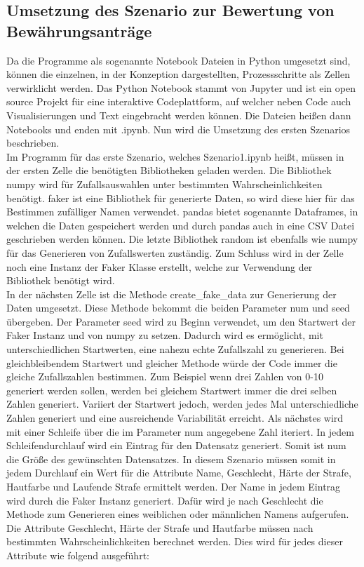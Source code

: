 \begin{onehalfspace}
\subsection{Umsetzung des Szenario zur Bewertung von Bewährungsanträge}
\label{umsetzungsz1}
Da die Programme als sogenannte Notebook Dateien in Python umgesetzt sind, können die einzelnen, in der Konzeption dargestellten, Prozessschritte als Zellen verwirklicht werden. Das Python Notebook stammt von Jupyter und ist ein open source Projekt für eine interaktive Codeplattform, auf welcher neben Code auch Visualisierungen und Text eingebracht werden können. Die Dateien heißen dann Notebooks und enden mit \glqq{}.ipynb\grqq{}. Nun wird die Umsetzung des ersten Szenarios beschrieben.\\
Im Programm für das erste Szenario, welches \glqq{}Szenario1.ipynb\grqq{} heißt, müssen in der ersten Zelle die benötigten Bibliotheken geladen werden.
Die Bibliothek \glqq{}numpy\grqq{} wird für Zufallsauswahlen unter bestimmten Wahrscheinlichkeiten benötigt. \glqq{}faker\grqq{} ist eine Bibliothek für generierte Daten, so wird diese hier für das Bestimmen zufälliger Namen verwendet. \glqq{}pandas\grqq{} bietet sogenannte Dataframes, in welchen die Daten gespeichert werden und durch \glqq{}pandas\grqq{} auch in eine CSV Datei geschrieben werden können. Die letzte Bibliothek \glqq{}random\grqq{} ist ebenfalls wie \glqq{}numpy\grqq{} für das Generieren von Zufallswerten zuständig. Zum Schluss wird in der Zelle noch eine Instanz der Faker Klasse erstellt, welche zur Verwendung der Bibliothek benötigt wird.\\
In der nächsten Zelle ist die Methode \glqq{}create\_fake\_data\grqq{} zur Generierung der Daten umgesetzt. Diese Methode bekommt die beiden Parameter \glqq{}num\grqq{} und \glqq{}seed\grqq{} übergeben. Der Parameter \glqq{}seed\grqq{} wird zu Beginn verwendet, um den Startwert der Faker Instanz und von \glqq{}numpy\grqq{} zu setzen. Dadurch wird es ermöglicht, mit unterschiedlichen Startwerten, eine nahezu \glqq{}echte\grqq{} Zufallszahl zu generieren. Bei gleichbleibendem Startwert und gleicher Methode würde der Code immer die gleiche Zufallszahlen bestimmen. Zum Beispiel wenn drei Zahlen von 0-10 generiert werden sollen, werden bei gleichem Startwert immer die drei selben Zahlen generiert. Variiert der Startwert jedoch, werden jedes Mal unterschiedliche Zahlen generiert und eine ausreichende Variabilität erreicht. Als nächstes wird mit einer Schleife über die im Parameter \glqq{}num\grqq{} angegebene Zahl iteriert. In jedem Schleifendurchlauf wird ein Eintrag für den Datensatz generiert. Somit ist \glqq{}num\grqq{} die Größe des gewünschten Datensatzes. In diesem Szenario müssen somit in jedem Durchlauf ein Wert für die Attribute Name, Geschlecht, Härte der Strafe, Hautfarbe und Laufende Strafe ermittelt werden. Der Name in jedem Eintrag wird durch die Faker Instanz generiert. Dafür wird je nach Geschlecht die Methode zum Generieren eines weiblichen oder männlichen Namens aufgerufen. Die Attribute Geschlecht, Härte der Strafe und Hautfarbe müssen nach bestimmten Wahrscheinlichkeiten berechnet werden. Dies wird für jedes dieser Attribute wie folgend ausgeführt:\\

\end{onehalfspace}
